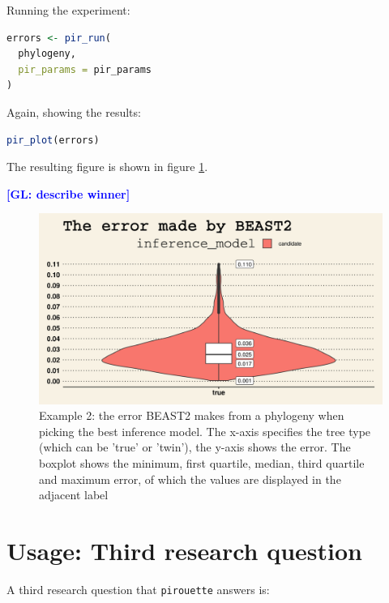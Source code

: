 \documentclass{article}
\newcommand{\giovanni}[1]{\textcolor{blue}{\textbf{[GL: #1]}}}
\begin{document}
Running the experiment:

\begin{lstlisting}[language=R, floatplacement=H, frame=single]
errors <- pir_run(
  phylogeny,
  pir_params = pir_params
)
\end{lstlisting}

Again, showing the results:

\begin{lstlisting}[language=R, floatplacement=H, frame=single]
pir_plot(errors)
\end{lstlisting}

The resulting figure is shown in figure \ref{fig:example_2}.

\giovanni{describe winner}

\begin{figure}[h]
  \includegraphics[width=\textwidth]{figure_example_2.png}
  \caption{
    Example 2: the error BEAST2 makes from a phylogeny when
    picking the best inference model.
    The x-axis specifies the tree type (which can be 'true' or 'twin'), the y-axis shows the error.
    The boxplot shows the minimum, first quartile, median, third 
    quartile and maximum error, of which the values are displayed 
    in the adjacent label
  }
  \label{fig:example_2}
\end{figure}

\section{Usage: Third research question}

A third research question that \verb;pirouette; answers is:
\end{document}

